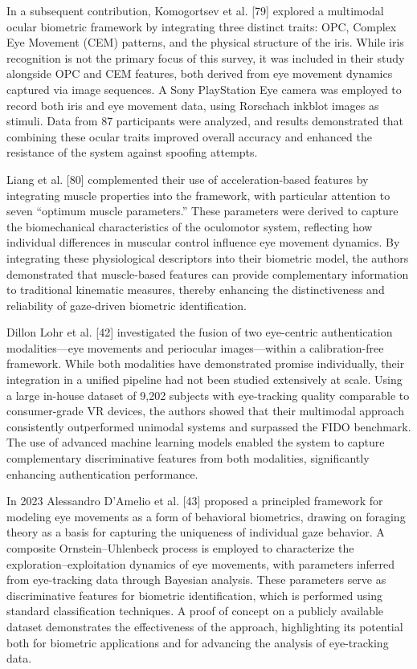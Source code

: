 \documentclass[12pt]{report}
\begin{document}
In a subsequent contribution, Komogortsev et al. [79] explored a multimodal ocular biometric framework by integrating three distinct traits: OPC, Complex Eye Movement (CEM) patterns, and the physical structure of the iris.
While iris recognition is not the primary focus of this survey, it was included in their study alongside OPC and CEM features, both derived from eye movement dynamics captured via image sequences. 
A Sony PlayStation Eye camera was employed to record both iris and eye movement data, using Rorschach inkblot images as stimuli.
Data from 87 participants were analyzed, and results demonstrated that combining these ocular traits improved overall accuracy and enhanced the resistance of the system against spoofing attempts.

Liang et al. [80] complemented their use of acceleration-based features by integrating muscle properties into the framework, with particular attention to seven “optimum muscle parameters.”
These parameters were derived to capture the biomechanical characteristics of the oculomotor system, reflecting how individual differences in muscular control influence eye movement dynamics.
By integrating these physiological descriptors into their biometric model, the authors demonstrated that muscle-based features can provide complementary information to traditional kinematic measures, thereby enhancing the distinctiveness and reliability of gaze-driven biometric identification.

Dillon Lohr et al. [42] investigated the fusion of two eye-centric authentication modalities—eye movements and periocular images—within a calibration-free framework. 
While both modalities have demonstrated promise individually, their integration in a unified pipeline had not been studied extensively at scale.
Using a large in-house dataset of 9,202 subjects with eye-tracking quality comparable to consumer-grade VR devices, the authors showed that their multimodal approach consistently outperformed unimodal systems and surpassed the FIDO benchmark.
The use of advanced machine learning models enabled the system to capture complementary discriminative features from both modalities, significantly enhancing authentication performance.

In 2023 Alessandro D'Amelio et al. [43] proposed a principled framework for modeling eye movements as a form of behavioral biometrics, drawing on foraging theory as a basis for capturing the uniqueness of individual gaze behavior. 
A composite Ornstein–Uhlenbeck process is employed to characterize the exploration–exploitation dynamics of eye movements, with parameters inferred from eye-tracking data through Bayesian analysis.
These parameters serve as discriminative features for biometric identification, which is performed using standard classification techniques.
A proof of concept on a publicly available dataset demonstrates the effectiveness of the approach, highlighting its potential both for biometric applications and for advancing the analysis of eye-tracking data.
\end{document}
